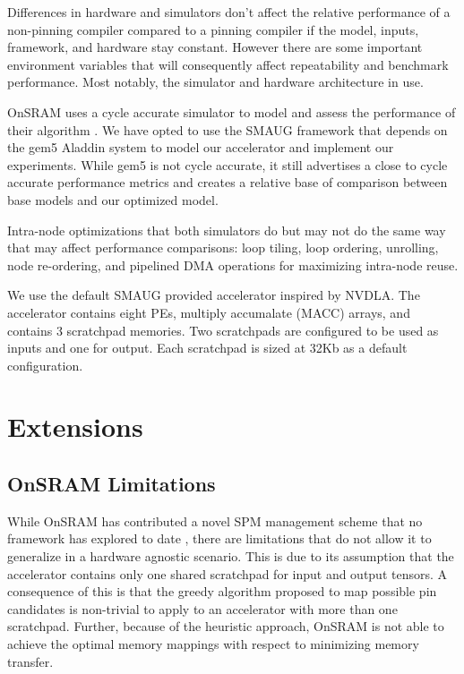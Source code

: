 Differences in hardware and simulators don't affect the relative performance of
a non-pinning compiler compared to a pinning compiler if the model, inputs,
framework, and hardware stay constant. However there are some important
environment variables that will consequently affect repeatability and benchmark
performance. Most notably, the simulator and hardware architecture in use.

OnSRAM uses a cycle accurate simulator to model and assess the performance of
their algorithm \cite{onsram}.  We have opted to use the SMAUG\cite{smaug}
framework that depends on the gem5 Aladdin\cite{aladdin} system to model our
accelerator and implement our experiments.
While gem5 is not cycle accurate, it still advertises a close to cycle accurate
performance metrics and creates a relative base of comparison between base
models and our optimized model.


Intra-node optimizations that both simulators do but may not do the same way
that may affect performance comparisons: loop tiling, loop ordering, unrolling,
node re-ordering, and pipelined DMA operations for maximizing intra-node reuse.

We use the default SMAUG provided accelerator inspired by NVDLA\cite{smaug}.
The accelerator contains eight PEs, multiply accumalate (MACC) arrays, and
contains 3 scratchpad memories\cite{smaug}. Two scratchpads are configured to
be used as inputs and one for output. Each scratchpad is sized at 32Kb as a default
configuration.


\section{Extensions}


\subsection{OnSRAM Limitations}

While OnSRAM has contributed a novel SPM management scheme that no framework
has explored to date \cite{onsram}, there are limitations that do not allow it to
generalize in a hardware agnostic scenario. This is due to its assumption that
the accelerator contains only one shared scratchpad for input and output
tensors. A consequence of this is that the greedy algorithm proposed to map
possible pin candidates is non-trivial to apply to an accelerator with more
than one scratchpad. Further, because of the heuristic approach, OnSRAM is not
able to achieve the optimal memory mappings with respect to minimizing memory
transfer.

